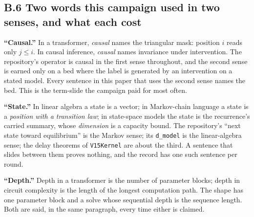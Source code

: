 \documentclass[11pt,a4paper]{article}
\theoremstyle{plain}
\theoremstyle{definition}
\theoremstyle{remark}
\begin{document}
\subsection{B.6 Two words this campaign used in two senses, and what
each
cost}\label{b.6-two-words-this-campaign-used-in-two-senses-and-what-each-cost}

\textbf{``Causal.''} In a transformer, \emph{causal} names the
triangular mask: position \(i\) reads only \(j\le i\). In causal
inference, \emph{causal} names invariance under intervention. The
repository's operator is causal in the first sense throughout, and the
second sense is earned only on a bed where the label is generated by an
intervention on a stated model. Every sentence in this paper that uses
the second sense names the bed. This is the term-slide the campaign paid
for most often.

\textbf{``State.''} In linear algebra a state is a vector; in
Markov-chain language a state is a \emph{position with a transition
law}; in state-space models the state is the recurrence's carried
summary, whose \emph{dimension} is a capacity bound. The repository's
``next state toward equilibrium'' is the Markov sense; its
\texttt{d\_model} is the linear-algebra sense; the delay theorems of
\texttt{V15Kernel} are about the third. A sentence that slides between
them proves nothing, and the record has one such sentence per round.

\textbf{``Depth.''} Depth in a transformer is the number of parameter
blocks; depth in circuit complexity is the length of the longest
computation path. The shape has one parameter block and a solve whose
sequential depth is the sequence length. Both are said, in the same
paragraph, every time either is claimed.


\end{document}
